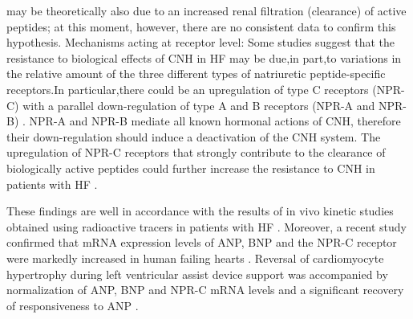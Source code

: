 \documentclass[14pt,a4paper,onecolumn]{extarticle}
\begin{document}
may be theoretically also due to an increased renal filtration (clearance) of active peptides;
at this moment, however, there are no consistent data to confirm this hypothesis.
Mechanisms acting at receptor level: Some studies suggest that the resistance to biological effects of CNH in HF may be due,in part,to variations in the relative amount of the three
different types of natriuretic peptide-specific receptors.In particular,there could be an upregulation of type C receptors (NPR-C) with a parallel down-regulation of type A and B receptors (NPR-A and NPR-B) \citep{bib343} \citep{bib344} \citep{bib345} \citep{bib346} \citep{bib347}. NPR-A and NPR-B mediate all known hormonal actions
of CNH, therefore their down-regulation should induce a deactivation of the CNH system.
The upregulation of NPR-C receptors that strongly contribute to the clearance of biologically active peptides could further increase the resistance to CNH in patients with HF \citep{bib343}.

These findings are well in accordance with the results of in vivo kinetic studies obtained
using radioactive tracers in patients with HF \citep{bib332} \citep{bib333}. Moreover, a recent study confirmed
that mRNA expression levels of ANP, BNP and the NPR-C receptor were markedly
increased in human failing hearts \citep{bib346}. Reversal of cardiomyocyte hypertrophy during
left ventricular assist device support was accompanied by normalization of ANP, BNP and
NPR-C mRNA levels and a significant recovery of responsiveness to ANP \citep{bib347}.
\end{document}
